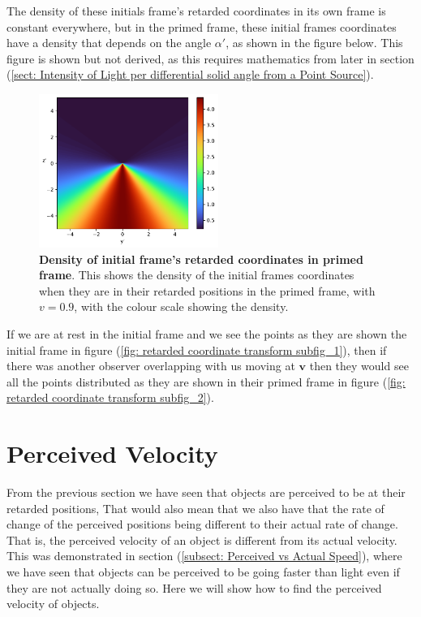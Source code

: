 The density of these  initials frame's retarded coordinates in its own frame is constant everywhere, but in the primed frame, these initial frames coordinates have a density that depends on the angle $\alpha'$, as shown in the figure below.
This figure is shown but not derived, as this requires mathematics from later in section (\ref{sect: Intensity of Light per differential solid angle from a Point Source}).

\begin{figure}[H]
	\centering
	\includegraphics[height=5cm]{images/pdf/coord_transform_Retarded_Coordinate_Density_Transform.pdf}
	\caption{\textbf{Density of initial frame's retarded coordinates in primed frame}. This shows the density of the initial frames coordinates when they are in their retarded positions in the primed frame, with $v=0.9$, with the colour scale showing the density.}
	\label{fig: Density of initial frame's retarded coordinates in primed frame}
\end{figure}

If we are at rest in the initial frame and we see the points as they are shown the initial frame in figure (\ref{fig: retarded coordinate transform subfig_1}), then if there was another observer overlapping with us moving at $\mathbf{v}$ then they would see all the points distributed as they are shown in their primed frame in figure (\ref{fig: retarded coordinate transform subfig_2}).

\section{Perceived Velocity} \label{sect: Perceived Velocity}

From the previous section we have seen that objects are perceived to be at their retarded positions, That would also mean that we also have that the rate of change of the perceived positions being different to their actual rate of change.
That is, the perceived velocity of an object is different from its actual velocity.
This was demonstrated in section (\ref{subsect: Perceived vs Actual Speed}), where we have seen that objects can be perceived to be going faster than light even if they are not actually doing so.
Here we will show how to find the perceived velocity of objects.

